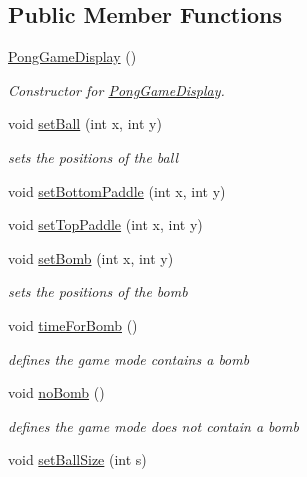 \subsection*{Public Member Functions}
\begin{DoxyCompactItemize}
\item 
\hyperlink{classview_1_1_pong_game_display_a1d578a032b81c4025ba91e6366672e07}{Pong\+Game\+Display} ()
\begin{DoxyCompactList}\small\item\em Constructor for \hyperlink{classview_1_1_pong_game_display}{Pong\+Game\+Display}. \end{DoxyCompactList}\item 
void \hyperlink{classview_1_1_pong_game_display_ac6afa3842b0a26be46dd0b7d202d887d}{set\+Ball} (int x, int y)
\begin{DoxyCompactList}\small\item\em sets the positions of the ball \end{DoxyCompactList}\item 
void \hyperlink{classview_1_1_pong_game_display_aa2f0ba3a3f8bc84bd079302904a57133}{set\+Bottom\+Paddle} (int x, int y)
\item 
void \hyperlink{classview_1_1_pong_game_display_a175282d960f6beec7819bd373f09f170}{set\+Top\+Paddle} (int x, int y)
\item 
void \hyperlink{classview_1_1_pong_game_display_adb358611d0a270aaf5954141ec8d35c0}{set\+Bomb} (int x, int y)
\begin{DoxyCompactList}\small\item\em sets the positions of the bomb \end{DoxyCompactList}\item 
void \hyperlink{classview_1_1_pong_game_display_a67b7b51feffc6573e92ac9c979ade0e2}{time\+For\+Bomb} ()
\begin{DoxyCompactList}\small\item\em defines the game mode contains a bomb \end{DoxyCompactList}\item 
void \hyperlink{classview_1_1_pong_game_display_a51b69bc0f6f840b4c736049115e0f449}{no\+Bomb} ()
\begin{DoxyCompactList}\small\item\em defines the game mode does not contain a bomb \end{DoxyCompactList}\item 
void \hyperlink{classview_1_1_pong_game_display_a295d4a14e718454eb223a5bb06141d53}{set\+Ball\+Size} (int s)

\end{DoxyCompactItemize}
